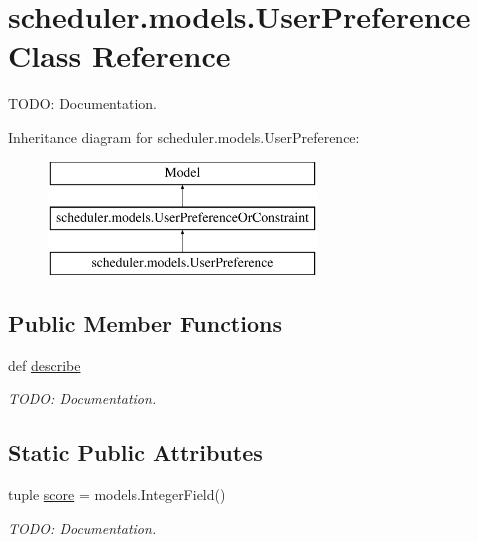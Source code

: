 \hypertarget{classscheduler_1_1models_1_1_user_preference}{\section{scheduler.\-models.\-User\-Preference Class Reference}
\label{classscheduler_1_1models_1_1_user_preference}
}


T\-O\-D\-O\-: Documentation.  


Inheritance diagram for scheduler.\-models.\-User\-Preference\-:\begin{figure}[H]
\begin{center}
\leavevmode
\includegraphics[height=3.000000cm]{classscheduler_1_1models_1_1_user_preference}
\end{center}
\end{figure}
\subsection*{Public Member Functions}
\begin{DoxyCompactItemize}
\item 
\hypertarget{classscheduler_1_1models_1_1_user_preference_a9f811ec38d568d99837e79b2b0699da6}{def \hyperlink{classscheduler_1_1models_1_1_user_preference_a9f811ec38d568d99837e79b2b0699da6}{describe}}\label{classscheduler_1_1models_1_1_user_preference_a9f811ec38d568d99837e79b2b0699da6}

\begin{DoxyCompactList}\small\item\em T\-O\-D\-O\-: Documentation. \end{DoxyCompactList}\end{DoxyCompactItemize}
\subsection*{Static Public Attributes}
\begin{DoxyCompactItemize}
\item 
\hypertarget{classscheduler_1_1models_1_1_user_preference_aefe583851d963dac6a85e6f8badfbffa}{tuple \hyperlink{classscheduler_1_1models_1_1_user_preference_aefe583851d963dac6a85e6f8badfbffa}{score} = models.\-Integer\-Field()}\label{classscheduler_1_1models_1_1_user_preference_aefe583851d963dac6a85e6f8badfbffa}

\begin{DoxyCompactList}\small\item\em T\-O\-D\-O\-: Documentation. \end{DoxyCompactList}\end{DoxyCompactItemize}


